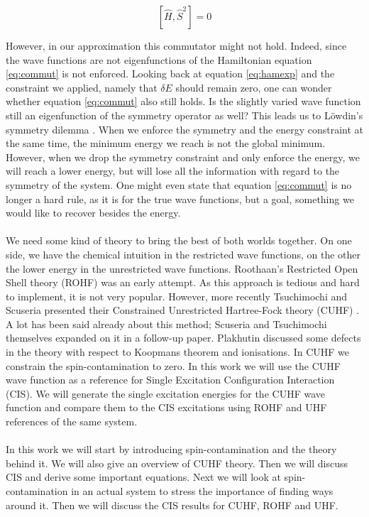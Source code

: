 \documentclass[twoside,twocolumn,9pt]{article}
\begin{document}
\begin{equation}\label{eq:commut}
  [\hat{H}, \hat{S}^2] = 0
\end{equation}

However, in our approximation this commutator might not hold. Indeed, since the wave functions are not eigenfunctions of the Hamiltonian equation \eqref{eq:commut} is not enforced.
Looking back at equation \eqref{eq:hamexp} and the constraint we applied, namely that $\delta E$ should
remain zero, one can wonder whether equation \eqref{eq:commut} also still holds. Is the slightly varied wave function still an eigenfunction of the symmetry operator as well?
This leads us to Löwdin's symmetry dilemma \cite{Lowdin1963}. When we enforce the symmetry and the energy constraint at the same time, the minimum energy we reach is not the
global minimum. However, when we drop the symmetry constraint and only enforce the energy, we will reach a lower energy, but will lose all the information with regard to the
symmetry of the system. One might even state that equation \eqref{eq:commut} is no longer a hard rule, as it is for the true wave functions, but a goal, something we would like to
recover besides the energy.
\paragraph*{}
We need some kind of theory to bring the best of both worlds together. On one side, we have the chemical intuition in the restricted wave functions, on the other the lower
energy in the unrestricted wave functions. Roothaan's Restricted Open Shell theory (ROHF)\cite{Roothaan1960} was an early attempt. As this approach is tedious and hard to implement,
it is not very popular\cite{Scuseria2010, Bally2008}. However, more recently Tsuchimochi and Scuseria presented their Constrained Unrestricted Hartree-Fock theory (CUHF)
\cite{Scuseria2010}. A lot has been said
already about this method; Scuseria and Tsuchimochi themselves expanded on it in a follow-up paper\cite{Scuseria2011}. Plakhutin discussed some defects in the theory with respect to
Koopmans theorem and ionisations\cite{Plakhutin2014}. In CUHF we constrain the spin-contamination to zero. In this work we will use the CUHF wave function as a reference for
Single Excitation Configuration Interaction (CIS). We will generate the single excitation energies for the CUHF wave function and compare them to the CIS excitations using
ROHF and UHF references of the same system.
\paragraph*{}
In this work we will start by introducing spin-contamination and the theory behind it. We will also give an overview of CUHF theory. Then we will discuss CIS and derive some important 
equations. Next we will look at spin-contamination in an actual system to stress the importance of finding ways around it. Then we will discuss the CIS results for CUHF, ROHF and UHF.
\end{document}
